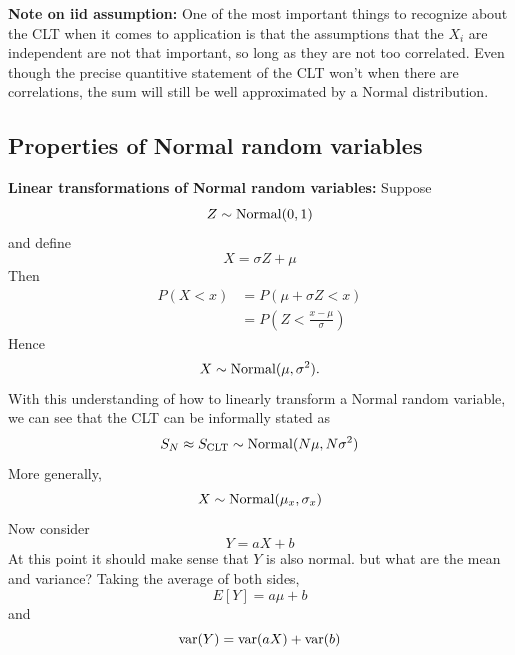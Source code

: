  {\bf Note on iid assumption:} One of the most important things to recognize about the CLT when it comes to application is that the assumptions that the $X_i$ are independent are not that important, so long as they are not too correlated. Even though the precise quantitive statement of the CLT won't when there are correlations, the sum will still be well approximated by a Normal distribution. 






\subsection{Properties of Normal random variables}

 {\bf Linear transformations of Normal random variables:}  Suppose 
\begin{equation*}
Z \sim {\rm Normal}(0,1)
\end{equation*}
and define 
\begin{equation*}
X = \sigma Z + \mu 
\end{equation*}
Then 
\begin{align*}
P(X<x) &= P(\mu + \sigma Z<x) \\
&= P\left(Z<\frac{x - \mu}{\sigma}\right)
\end{align*}
Hence 
\begin{equation*}
X \sim {\rm Normal}(\mu,\sigma^2).
\end{equation*} 
With this understanding of how to linearly transform a Normal random variable, we can see that the CLT can be informally stated as
\begin{equation*}
S_N \approx S_{\rm CLT} \sim {\rm Normal}(N\mu,N\sigma^2)
\end{equation*}
 More generally, 
\begin{equation*}
X \sim {\rm Normal}(\mu_x,\sigma_x)
\end{equation*}
Now consider 
\begin{equation*}\label{eq:linear}
Y = aX + b 
\end{equation*}
At this point it should make sense that $Y$ is also normal. 
 but what are the mean and variance? Taking the average of both sides, 
\begin{equation*}
E[Y] = a\mu + b
\end{equation*}
and 
\begin{equation*}
{\rm var}(Y) = {\rm var}(aX) + {\rm var}(b)
\end{equation*}
